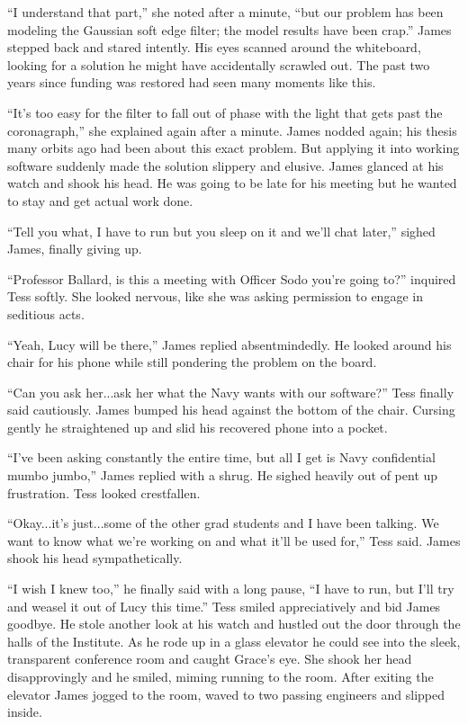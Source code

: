 \documentclass[12pt]{article} %
\begin{document}
``I understand that part,'' she noted after a minute, ``but our problem has been modeling the Gaussian soft edge filter; the model results have been crap.'' James stepped back and stared intently. His eyes scanned around the whiteboard, looking for a solution he might have accidentally scrawled out. The past two years since funding was restored had seen many moments like this.

``It's too easy for the filter to fall out of phase with the light that gets past the coronagraph,'' she explained again after a minute. James nodded again; his thesis many orbits ago had been about this exact problem. But applying it into working software suddenly made the solution slippery and elusive. James glanced at his watch and shook his head. He was going to be late for his meeting but he wanted to stay and get actual work done.

``Tell you what, I have to run but you sleep on it and we'll chat later,'' sighed James, finally giving up.

``Professor Ballard, is this a meeting with Officer Sodo you're going to?'' inquired Tess softly. She looked nervous, like she was asking permission to engage in seditious acts.

``Yeah, Lucy will be there,'' James replied absentmindedly. He looked around his chair for his phone while still pondering the problem on the board. 

``Can you ask her...ask her what the Navy wants with our software?'' Tess finally said cautiously. James bumped his head against the bottom of the chair. Cursing gently he straightened up and slid his recovered phone into a pocket.

``I've been asking constantly the entire time, but all I get is Navy confidential mumbo jumbo,'' James replied with a shrug. He sighed heavily out of pent up frustration. Tess looked crestfallen.

``Okay...it's just...some of the other grad students and I have been talking. We want to know what we're working on and what it'll be used for,'' Tess said. James shook his head sympathetically.

``I wish I knew too,'' he finally said with a long pause, ``I have to run, but I'll try and weasel it out of Lucy this time.'' Tess smiled appreciatively and bid James goodbye. He stole another look at his watch and hustled out the door through the halls of the Institute. As he rode up in a glass elevator he could see into the sleek, transparent conference room and caught Grace's eye. She shook her head disapprovingly and he smiled, miming running to the room. After exiting the elevator James jogged to the room, waved to two passing engineers and slipped inside.
\end{document}

